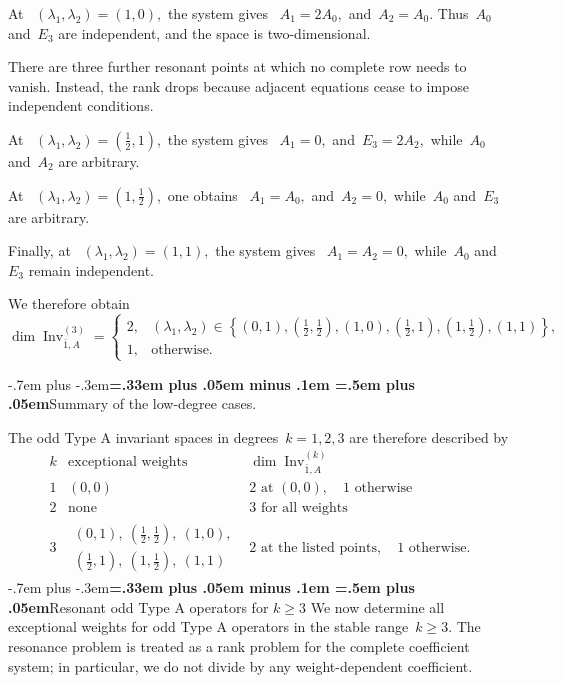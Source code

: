 \documentclass[12pt,a4paper]{amsart}
\makeatletter
\providecommand{\headspaces}{\spaceskip=.33em plus .05em minus .1em \xspaceskip=.5em plus .05em}
\def\subsubsection{\@startsection{subsubsection}{3}{0pt}{-1ex \@plus -.4ex \@minus -.2ex}%
  {-.7em plus -.3em}{\normalfont\normalsize\bfseries\boldmath\headspaces}}
\def\paragraph{\@startsection{paragraph}{3}{0pt}{-1ex \@plus -.4ex \@minus -.2ex}%
  {-.7em plus -.3em}{\normalfont\normalsize\bfseries\boldmath\headspaces}}
\theoremstyle{thm}
\theoremstyle{definition}
\makeatother
\begin{document}
At~%
$
(\lambda_1,\lambda_2)=(1,0),
$ the system gives~%
$
A_1=2A_0,$ and~$
A_2=A_0.
$
Thus~\(A_0\) and~\(E_3\) are independent, and the space is two-dimensional.

There are three further resonant points at which no complete row needs
to vanish. Instead, the rank drops because adjacent equations cease to
impose independent conditions.

At~%
$
(\lambda_1,\lambda_2)
=
\left(\frac12,1\right),
$ the system gives~%
$
A_1=0,
$ and~$
E_3=2A_2,
$ while~\(A_0\) and~\(A_2\) are arbitrary.

At~%
$
(\lambda_1,\lambda_2)
=
\left(1,\frac12\right),
$ one obtains~%
$
A_1=A_0,
$ and~$
A_2=0,
$ while~\(A_0\) and~\(E_3\) are arbitrary.

Finally, at~%
$
(\lambda_1,\lambda_2)=(1,1),
$
the system gives~%
$
A_1=A_2=0,
$ while~\(A_0\) and~\(E_3\) remain independent.

We therefore obtain
\[
\dim\operatorname{Inv}_{\bar1,A}^{(3)}
=
\begin{cases}
2,
&
(\lambda_1,\lambda_2)
\in
\left\{
(0,1),
\left(\frac12,\frac12\right),
(1,0),
\left(\frac12,1\right),
\left(1,\frac12\right),
(1,1)
\right\},
\\[4mm]
1,
&
\text{otherwise}.
\end{cases}
\]

\paragraph{Summary of the low-degree cases.}

The odd Type A invariant spaces in degrees~\(k=1,2,3\) are therefore
described by
\[
\begin{array}{c|c|c}
k & \text{exceptional weights} & \dim\operatorname{Inv}_{\bar1,A}^{(k)}
\\ \hline
1
&
(0,0)
&
2\text{ at }(0,0),\quad 1\text{ otherwise}
\\[2mm]
2
&
\text{none}
&
3\text{ for all weights}
\\[2mm]
3
&
\begin{array}{c}
(0,1),\ (\frac12,\frac12),\ (1,0),\\[1mm]
(\frac12,1),\ (1,\frac12),\ (1,1)
\end{array}
&
2\text{ at the listed points},\quad 1\text{ otherwise}.
\end{array}
\]
\subsubsection{Resonant odd Type A operators for \(k\geq3\)}
We now determine all exceptional weights for odd Type A operators in
the stable range~\(k\geq3\). The resonance problem is treated as a
rank problem for the complete coefficient system; in particular, we
do not divide by any weight-dependent coefficient.
\end{document}

